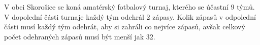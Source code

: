 \subsubsection{}
V obci Skorošice se koná amatérský fotbalový turnaj, kterého se účastní 9 týmů.
V dopolední části turnaje každý tým odehrál 2 zápasy. Kolik zápasů v odpolední
části musí každý tým odehrát, aby si zahráli co nejvíce zápasů, avšak celkový
počet odehraných zápasů musí být menší jak 32.

